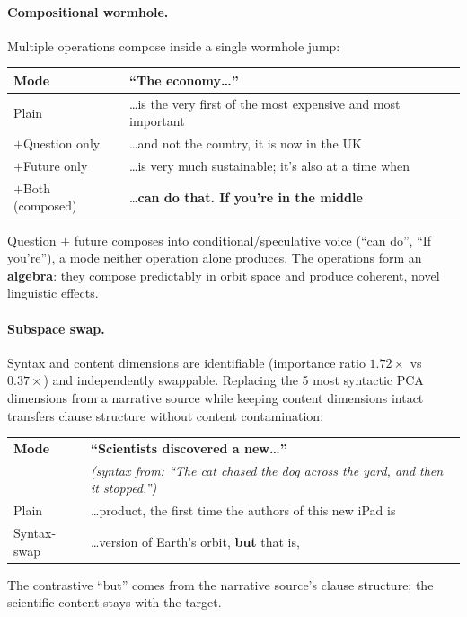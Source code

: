 \documentclass[11pt, a4paper]{article}
\theoremstyle{plain}
\theoremstyle{definition}
\theoremstyle{remark}
\begin{document}
\paragraph{Compositional wormhole.}
Multiple operations compose inside a single wormhole jump:
\begin{center}\small
\begin{tabular}{lp{9cm}}
\toprule
\textbf{Mode} & \textbf{``The economy\ldots''} \\
\midrule
Plain & \ldots is the very first of the most expensive and most important \\
$+$Question only & \ldots and not the country, it is now in the UK \\
$+$Future only & \ldots is very much sustainable; it's also at a time when \\
$+$Both (composed) & \ldots \textbf{can do that. If you're in the middle} \\
\bottomrule
\end{tabular}
\end{center}
Question $+$ future composes into conditional/speculative voice (``can do'', ``If you're''), a mode neither operation alone produces.
The operations form an \textbf{algebra}: they compose predictably in orbit space and produce coherent, novel linguistic effects.

\paragraph{Subspace swap.}
Syntax and content dimensions are identifiable (importance ratio $1.72\times$ vs $0.37\times$) and independently swappable.
Replacing the 5 most syntactic PCA dimensions from a narrative source while keeping content dimensions intact transfers clause structure without content contamination:
\begin{center}\small
\begin{tabular}{lp{9cm}}
\toprule
\textbf{Mode} & \textbf{``Scientists discovered a new\ldots''} \\
& \emph{(syntax from: ``The cat chased the dog across the yard, and then it stopped.'')} \\
\midrule
Plain & \ldots product, the first time the authors of this new iPad is \\
Syntax-swap & \ldots version of Earth's orbit, \textbf{but} that is, \\
\bottomrule
\end{tabular}
\end{center}
The contrastive ``but'' comes from the narrative source's clause structure; the scientific content stays with the target.
\end{document}
